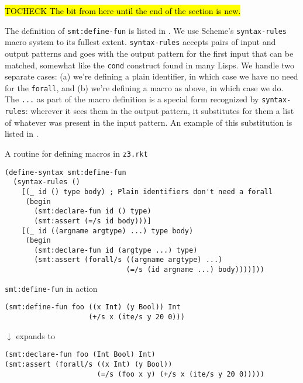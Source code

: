 \hl{TOCHECK The bit from here until the end of the section is new.}

The definition of \texttt{smt:define-fun} is listed in .
We use Scheme's \texttt{syntax-rules} macro system \cite[Section~4.3.2]{scheme-r5rs}
to its fullest extent. \texttt{syntax-rules} accepts pairs of input and output
patterns and goes with the output pattern for the first input that can be
matched, somewhat like the \texttt{cond} construct found in many Lisps. We
handle two separate cases: (a) we're defining a plain identifier, in which
case we have no need for the \texttt{forall}, and (b) we're defining a macro
as above, in which case we do. The \texttt{...} as part of the macro
definition is a special form recognized by \texttt{syntax-rules}: wherever it
sees them in the output pattern, it substitutes for them a list of whatever
was present in the input pattern. An example of this substitution is listed in
.

\begin{program}
\caption{A routine for defining macros in \texttt{z3.rkt}}
\label{fig:define-fun}
\begin{verbatim}
(define-syntax smt:define-fun
  (syntax-rules ()
    [(_ id () type body) ; Plain identifiers don't need a forall
     (begin
       (smt:declare-fun id () type)
       (smt:assert (=/s id body)))]
    [(_ id ((argname argtype) ...) type body)
     (begin
       (smt:declare-fun id (argtype ...) type)
       (smt:assert (forall/s ((argname argtype) ...)
                             (=/s (id argname ...) body))))]))
\end{verbatim}
\end{program}

\begin{program}
\caption{\texttt{smt:define-fun} in action}
\label{fig:define-fun-example}

\begin{verbatim}
(smt:define-fun foo ((x Int) (y Bool)) Int
                    (+/s x (ite/s y 20 0)))
\end{verbatim}

\begin{center}
{\large $\downarrow$} {\small expands to}
\end{center}

\begin{verbatim}
(smt:declare-fun foo (Int Bool) Int)
(smt:assert (forall/s ((x Int) (y Bool))
                      (=/s (foo x y) (+/s x (ite/s y 20 0)))))
\end{verbatim}
\end{program}


